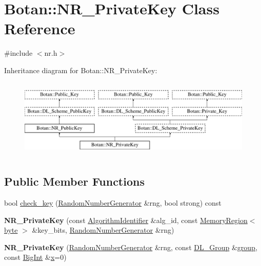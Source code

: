\hypertarget{classBotan_1_1NR__PrivateKey}{\section{Botan\-:\-:N\-R\-\_\-\-Private\-Key Class Reference}
\label{classBotan_1_1NR__PrivateKey}
}


{\ttfamily \#include $<$nr.\-h$>$}

Inheritance diagram for Botan\-:\-:N\-R\-\_\-\-Private\-Key\-:\begin{figure}[H]
\begin{center}
\leavevmode
\includegraphics[height=3.829060cm]{classBotan_1_1NR__PrivateKey}
\end{center}
\end{figure}
\subsection*{Public Member Functions}
\begin{DoxyCompactItemize}
\item 
bool \hyperlink{classBotan_1_1NR__PrivateKey_a5e096cae4e87bce02eb57ef9875a84ff}{check\-\_\-key} (\hyperlink{classBotan_1_1RandomNumberGenerator}{Random\-Number\-Generator} \&rng, bool strong) const 
\item 
\hypertarget{classBotan_1_1NR__PrivateKey_a573ae83194ad795ce099ac136e71561a}{{\bfseries N\-R\-\_\-\-Private\-Key} (const \hyperlink{classBotan_1_1AlgorithmIdentifier}{Algorithm\-Identifier} \&alg\-\_\-id, const \hyperlink{classBotan_1_1MemoryRegion}{Memory\-Region}$<$ \hyperlink{namespaceBotan_a7d793989d801281df48c6b19616b8b84}{byte} $>$ \&key\-\_\-bits, \hyperlink{classBotan_1_1RandomNumberGenerator}{Random\-Number\-Generator} \&rng)}\label{classBotan_1_1NR__PrivateKey_a573ae83194ad795ce099ac136e71561a}

\item 
\hypertarget{classBotan_1_1NR__PrivateKey_ae7929765510fe1f7a8bebed87b573199}{{\bfseries N\-R\-\_\-\-Private\-Key} (\hyperlink{classBotan_1_1RandomNumberGenerator}{Random\-Number\-Generator} \&rng, const \hyperlink{classBotan_1_1DL__Group}{D\-L\-\_\-\-Group} \&\hyperlink{classBotan_1_1DL__Scheme__PublicKey_a99e61704126f6c0fcdf5475027a46500}{group}, const \hyperlink{classBotan_1_1BigInt}{Big\-Int} \&\hyperlink{classBotan_1_1DL__Scheme__PrivateKey_a74f05875ab03ef8b35468d117e6a65e9}{x}=0)}\label{classBotan_1_1NR__PrivateKey_ae7929765510fe1f7a8bebed87b573199}

\end{DoxyCompactItemize}
